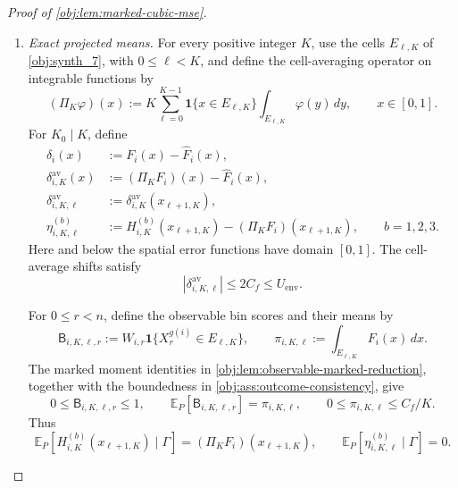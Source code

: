 \begin{proof}[Proof of \cref{obj:lem:marked-cubic-mse}]
\begin{enumerate}
The exact block sizes and the dyadic rules of
\cref{obj:synth_3,obj:synth_4,obj:synth_5,obj:synth_6}
give
\[
m_b\ge\lfloor n/4\rfloor\ge n/4-1\ge n/5>0
\quad(b=0,1,2,3),
\]
and
\[
\frac12m_0^{4/5}\le K_0\le m_0^{4/5},\qquad
\frac12m_0^{4/3}\le K_2\le m_0^{4/3},\qquad
\frac12m_0\le K_3\le m_0.
\]
Indeed, rounding a nonnegative logarithmic exponent down changes its power of two by a factor between \(1/2\) and \(1\). In particular,
\[
K_2\le n^{4/3},\qquad K_3\le n.
\]
The nesting property in \cref{obj:def:cubic-estimator} ensures that the pilot is constant on every correction cell, including its assigned endpoints.

\item \textit{Exact projected means.}
For every positive integer \(K\), use the cells \(E_{\ell,K}\) of \cref{obj:synth_7}, with \(0\le\ell<K\), and define the cell-averaging operator on integrable functions by
\[
(\Pi_K\varphi)(x)
:=
K\sum_{\ell=0}^{K-1}\mathbf1\{x\in E_{\ell,K}\}
\int_{E_{\ell,K}}\varphi(y)\,dy,
\qquad x\in[0,1].
\]
For \(K_0\mid K\), define
\[
\begin{aligned}
\delta_i(x)&:=F_i(x)-\widehat F_i(x),\\
\delta^{\mathrm{av}}_{i,K}(x)
&:=(\Pi_KF_i)(x)-\widehat F_i(x),\\
\delta^{\mathrm{av}}_{i,K,\ell}
&:=\delta^{\mathrm{av}}_{i,K}(x_{\ell+1,K}),\\
\eta^{(b)}_{i,K,\ell}
&:=H_{i,K}^{(b)}(x_{\ell+1,K})
-(\Pi_KF_i)(x_{\ell+1,K}),
\qquad b=1,2,3.
\end{aligned}
\]
Here and below the spatial error functions have domain \([0,1]\). The cell-average shifts satisfy
\[
|\delta^{\mathrm{av}}_{i,K,\ell}|
\le2C_f\le U_{\mathrm{env}}.
\]

For \(0\le r<n\), define the observable bin scores and their means by
\[
\mathsf B_{i,K,\ell,r}
:=
W_{i,r}\mathbf1\{X_r^{g(i)}\in E_{\ell,K}\},
\qquad
\pi_{i,K,\ell}:=\int_{E_{\ell,K}}F_i(x)\,dx.
\]
The marked moment identities in \cref{obj:lem:observable-marked-reduction}, together with the boundedness in \cref{obj:ass:outcome-consistency}, give
\[
0\le\mathsf B_{i,K,\ell,r}\le1,\qquad
\mathbb E_P[\mathsf B_{i,K,\ell,r}]=\pi_{i,K,\ell},
\qquad
0\le\pi_{i,K,\ell}\le C_f/K.
\]
Thus
\[
\mathbb E_P[H_{i,K}^{(b)}(x_{\ell+1,K})\mid\Gamma]
=(\Pi_KF_i)(x_{\ell+1,K}),
\qquad
\mathbb E_P[\eta^{(b)}_{i,K,\ell}\mid\Gamma]=0.
\]


\end{enumerate}
\end{proof}
